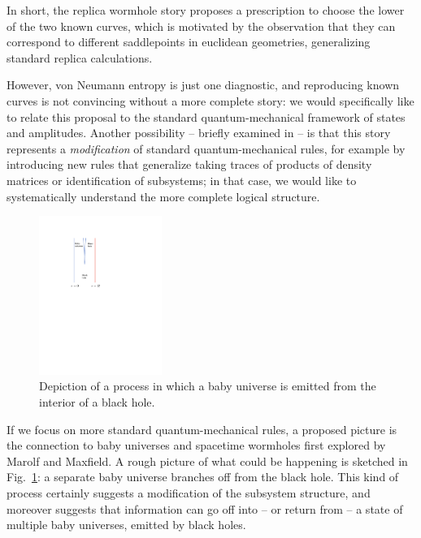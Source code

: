 \documentclass[11pt]{article}
\numberwithin{equation}{section}
\begin{document}
In short, the replica wormhole story proposes a prescription to choose the lower of the two known curves, which is motivated by the observation that they can correspond to different saddlepoints in euclidean geometries, generalizing standard replica calculations.

However, von Neumann entropy is just one diagnostic, and reproducing known curves is not convincing without a more complete story:  we would specifically like to relate this proposal to the standard quantum-mechanical framework of states and amplitudes.  Another possibility -- briefly examined in \cite{GiTu} -- is that this story represents a {\it modification} of standard quantum-mechanical rules, for example by introducing new rules that generalize taking traces of products of density matrices or identification of subsystems; in that case, we would like to systematically understand the more complete logical structure.

\begin{figure}[!hbtp] \begin{center}
\includegraphics[width=4cm]{Fig-bu.pdf}
\end{center}
\caption{Depiction of a process in which a baby universe is emitted from the interior of a black hole.}
\label{Figbu}
\end{figure} 

If we focus on  more standard quantum-mechanical rules, a proposed picture is the connection to baby universes and spacetime wormholes\cite{GiStinst,Cole,GiStinc,GiSt3Q} first explored by Marolf and Maxfield\cite{MaMa,MaMarev}.  A rough picture of what could be happening is sketched in Fig.~\ref{Figbu}: a separate baby universe branches off from the black hole.  This kind of process certainly suggests a modification of the subsystem structure, and moreover suggests that information can go off into -- or return from -- a state of multiple baby universes, emitted by black holes\cite{LRT,Hawkworm}.
\end{document}
